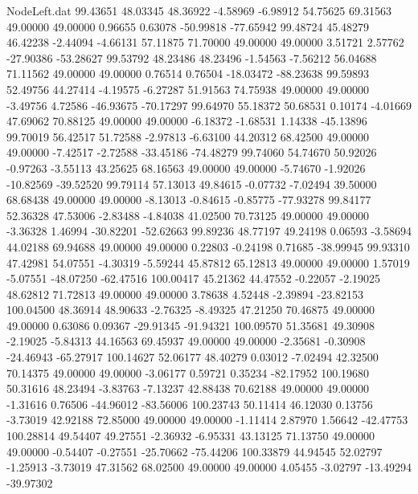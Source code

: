 \begin{filecontents}{NodeLeft.dat}
  99.43651   48.03345   48.36922    -4.58969   -6.98912   54.75625   69.31563   49.00000   49.00000    0.96655    0.63078  -50.99818  -77.65942
  99.48724   45.48279   46.42238    -2.44094   -4.66131   57.11875   71.70000   49.00000   49.00000    3.51721    2.57762  -27.90386  -53.28627
  99.53792   48.23486   48.23496    -1.54563   -7.56212   56.04688   71.11562   49.00000   49.00000    0.76514    0.76504  -18.03472  -88.23638
  99.59893   52.49756   44.27414    -4.19575   -6.27287   51.91563   74.75938   49.00000   49.00000   -3.49756    4.72586  -46.93675  -70.17297
  99.64970   55.18372   50.68531     0.10174   -4.01669   47.69062   70.88125   49.00000   49.00000   -6.18372   -1.68531    1.14338  -45.13896
  99.70019   56.42517   51.72588    -2.97813   -6.63100   44.20312   68.42500   49.00000   49.00000   -7.42517   -2.72588  -33.45186  -74.48279
  99.74060   54.74670   50.92026    -0.97263   -3.55113   43.25625   68.16563   49.00000   49.00000   -5.74670   -1.92026  -10.82569  -39.52520
  99.79114   57.13013   49.84615    -0.07732   -7.02494   39.50000   68.68438   49.00000   49.00000   -8.13013   -0.84615   -0.85775  -77.93278
  99.84177   52.36328   47.53006    -2.83488   -4.84038   41.02500   70.73125   49.00000   49.00000   -3.36328    1.46994  -30.82201  -52.62663
  99.89236   48.77197   49.24198     0.06593   -3.58694   44.02188   69.94688   49.00000   49.00000    0.22803   -0.24198    0.71685  -38.99945
  99.93310   47.42981   54.07551    -4.30319   -5.59244   45.87812   65.12813   49.00000   49.00000    1.57019   -5.07551  -48.07250  -62.47516
 100.00417   45.21362   44.47552    -0.22057   -2.19025   48.62812   71.72813   49.00000   49.00000    3.78638    4.52448   -2.39894  -23.82153
 100.04500   48.36914   48.90633    -2.76325   -8.49325   47.21250   70.46875   49.00000   49.00000    0.63086    0.09367  -29.91345  -91.94321
 100.09570   51.35681   49.30908    -2.19025   -5.84313   44.16563   69.45937   49.00000   49.00000   -2.35681   -0.30908  -24.46943  -65.27917
 100.14627   52.06177   48.40279     0.03012   -7.02494   42.32500   70.14375   49.00000   49.00000   -3.06177    0.59721    0.35234  -82.17952
 100.19680   50.31616   48.23494    -3.83763   -7.13237   42.88438   70.62188   49.00000   49.00000   -1.31616    0.76506  -44.96012  -83.56006
 100.23743   50.11414   46.12030     0.13756   -3.73019   42.92188   72.85000   49.00000   49.00000   -1.11414    2.87970    1.56642  -42.47753
 100.28814   49.54407   49.27551    -2.36932   -6.95331   43.13125   71.13750   49.00000   49.00000   -0.54407   -0.27551  -25.70662  -75.44206
 100.33879   44.94545   52.02797    -1.25913   -3.73019   47.31562   68.02500   49.00000   49.00000    4.05455   -3.02797  -13.49294  -39.97302

\end{filecontents}
